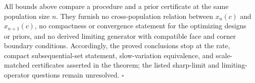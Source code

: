 All bounds above compare a procedure and a prior certificate at the same population size \(n\). They furnish no cross-population relation between \(x_n(c)\) and \(x_{n+1}(c)\), no compactness or convergence statement for the optimizing designs or priors, and no derived limiting generator with compatible face and corner boundary conditions. Accordingly, the proved conclusions stop at the rate, compact subsequential-set statement, slow-variation equivalence, and scale-matched certificates asserted in the theorem; the listed sharp-limit and limiting-operator questions remain unresolved. \(\square\)